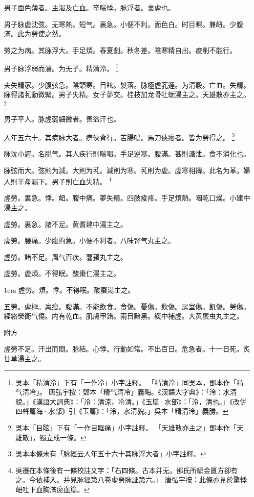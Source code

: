 男子面色薄者。主渴及亡血。卒喘悸。脉浮者。裏虗也。

男子脉虗沈弦。无寒熱。短气。裏急。小便不利。面色白。时目瞑。兼衄。少腹滿。此为勞使之然。

勞之为病。其脉浮大。手足煩。春夏劇。秋冬差。陰寒精自出。痠削不能行。

男子脉浮弱而濇。为无子。精清泠。
	\footnote{
		吳本「精清泠」下有「一作冷」小字註釋。
		「精清泠」同吳本，鄧本作「精气清冷」。
		唐弘宇按：鄧本「精气清冷」義晦。《漢語大字典》：「泠：水清貌。」《漢語大詞典》：「泠：清涼，冷清。」《玉篇·水部》：「泠，清也。」《改併四聲篇海·水部》引《玉篇》：「泠，水清貌。」吳本「精清泠」義勝。
	}

夫失精家。少腹弦急。陰頭寒。目眩。髮落。脉極虗芤遲。为清穀。亡血。失精。脉得諸芤動微緊。男子失精。女子夢交。桂枝加龙骨牡蛎湯主之。天雄散亦主之。
	\footnote{
		吳本「目眩」下有「一作目眶痛」小字註釋。
		「天雄散亦主之」鄧本作「天雄散」，獨立成一條。
	}

男子平人。脉虗弱細微者。善盜汗也。

人年五六十。其病脉大者。痹俠背行。苦腸鳴。馬刀俠癭者。皆为勞得之。
	\footnote{
		吳本本條末有「脉經云人年五十六十其脉浮大者」小字註釋。
	}

脉沈小遲。名脱气。其人疾行則喘喝。手足逆寒。腹滿。甚則溏泄。食不消化也。

脉弦而大。弦則为減。大則为芤。減則为寒。芤則为虗。虗寒相摶。此名为革。婦人則半產漏下。男子則亡血失精。
	\footnote{
		吳遷在本條後有一條校註文字：「右四條。古本并无。鄧氏所編金匱方卻有之。今依補入。并見脉經第八卷虛勞脉証第六。」
		唐弘宇按：此條亦見於驚悸衄吐下血胸滿瘀血篇。
	}

虗勞。裏急。悸。衄。腹中痛。夢失精。四肢痠疼。手足煩熱。咽乾口燥。小建中湯主之。

虗勞。裏急。諸不足。黄耆建中湯主之。

虗勞。腰痛。少腹拘急。小便不利者。八味腎气丸主之。

虗勞。諸不足。風气百疾。薯蕷丸主之。

虗勞。虗煩。不得眠。酸棗{\khaai 仁}湯主之。

\hangindent 1em
虗勞。煩。悸。不得眠。酸棗湯主之。{\qianjin}

五勞。虗極。羸瘦。腹滿。不能飲食。食傷。憂傷。飲傷。房室傷。飢傷。勞傷。經絡榮衛气傷。内有乾血。肌膚甲錯。兩目黯黑。緩中補虗。大黄䗪虫丸主之。

附方

虗勞不足。汗出而悶。脉結。心悸。行動如常。不出百日。危急者。十一日死。炙甘草湯主之。

